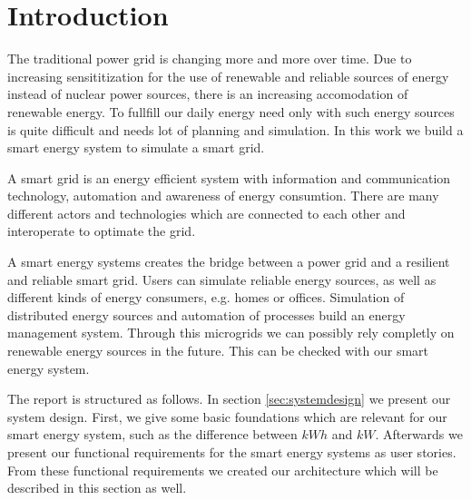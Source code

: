 \section{Introduction}

The traditional power grid is changing more and more over time.
Due to increasing sensititization for the use of renewable and reliable sources of energy instead of nuclear power sources, there is an increasing accomodation of renewable energy.
To fullfill our daily energy need only with such energy sources is quite difficult and needs lot of planning and simulation.
In this work we build a smart energy system to simulate a smart grid.

A smart grid is an energy efficient system with information and communication technology, automation and awareness of energy consumtion.
There are many different actors and technologies which are connected to each other and interoperate to optimate the grid.

A smart energy systems creates the bridge between a power grid and a resilient and reliable smart grid.
Users can simulate reliable energy sources, as well as different kinds of energy consumers, e.g. homes or offices.
Simulation of distributed energy sources and automation of processes build an energy management system.
Through this microgrids we can possibly rely completly on renewable energy sources in the future.
This can be checked with our smart energy system.

The report is structured as follows.
In section \ref{sec:systemdesign} we present our system design.
First, we give some basic foundations which are relevant for our smart energy system, such as the difference between $kWh$ and $kW$.
Afterwards we present our functional requirements for the smart energy systems as user stories.
From these functional requirements we created our architecture which will be described in this section as well.

